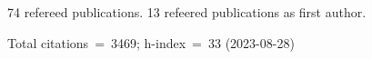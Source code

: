74 refereed publications. 13 refeered publications as first author.

Total citations~=~3469; h-index~=~33 (2023-08-28)